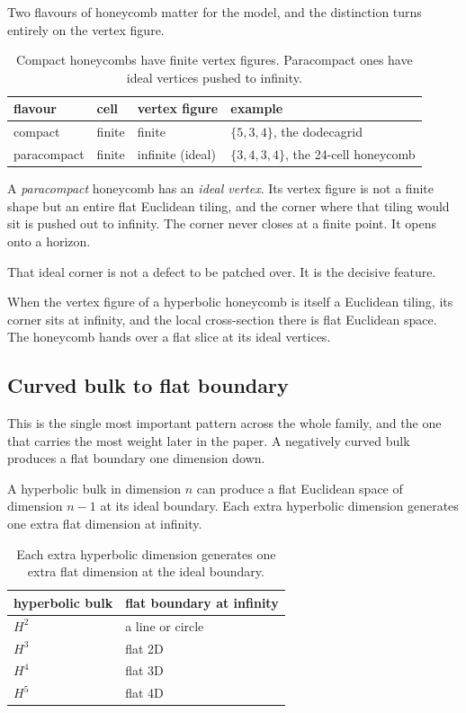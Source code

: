Two flavours of honeycomb matter for the model, and the distinction turns entirely on the vertex figure.

\begin{table}[ht]
\centering
\begin{tabular}{@{}llll@{}}
\toprule
flavour & cell & vertex figure & example \\
\midrule
compact & finite & finite & $\{5,3,4\}$, the dodecagrid \\
paracompact & finite & infinite (ideal) & $\{3,4,3,4\}$, the 24-cell honeycomb \\
\bottomrule
\end{tabular}
\caption{Compact honeycombs have finite vertex figures. Paracompact ones have ideal vertices pushed to infinity.}
\label{tab:compact-paracompact}
\end{table}

A \emph{paracompact} honeycomb has an \emph{ideal vertex}. Its vertex figure is not a finite shape but an entire flat Euclidean tiling, and the corner where that tiling would sit is pushed out to infinity. The corner never closes at a finite point. It opens onto a horizon.

That ideal corner is not a defect to be patched over. It is the decisive feature.

\begin{result}
When the vertex figure of a hyperbolic honeycomb is itself a Euclidean tiling, its corner sits at infinity, and the local cross-section there is flat Euclidean space. The honeycomb hands over a flat slice at its ideal vertices.
\end{result}

\subsection{Curved bulk to flat boundary}

This is the single most important pattern across the whole family, and the one that carries the most weight later in the paper. A negatively curved bulk produces a flat boundary one dimension down.

\begin{principle}
A hyperbolic bulk in dimension $n$ can produce a flat Euclidean space of dimension $n-1$ at its ideal boundary. Each extra hyperbolic dimension generates one extra flat dimension at infinity.
\end{principle}

\begin{table}[ht]
\centering
\begin{tabular}{@{}ll@{}}
\toprule
hyperbolic bulk & flat boundary at infinity \\
\midrule
$H^2$ & a line or circle \\
$H^3$ & flat 2D \\
$H^4$ & flat 3D \\
$H^5$ & flat 4D \\
\bottomrule
\end{tabular}
\caption{Each extra hyperbolic dimension generates one extra flat dimension at the ideal boundary.}
\label{tab:bulk-boundary}
\end{table}

